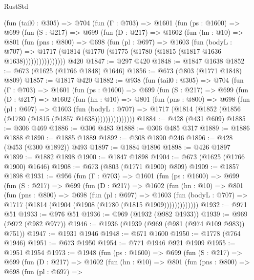 \begin{lexlean}{RustStd}
\begin{coremodule}
      (fun (tail0 : @305) =>
      @704
        (fun (Γ : @703) =>
        @1601
          (fun (ps : @1600) =>
          @699
            (fun (S : @217) =>
            @699
              (fun (D : @217) =>
              @1602
                (fun (hn : @10) =>
                @801
                  (fun (pns : @800) =>
                  @698
                    (fun (pl : @697) =>
                    @1603
                      (fun (bodyL : @707) =>
                      @1717 (@1814 (@1770 (@1775 (@1780 (@1815 (@1817 @1636 @1638))))))))))))))))
    @420
@1847 := @297 @420
@1848 := @1847 @1638
@1852 := @673 (@1625 (@1766 @1848) @1646)
@1856 := @673 (@803 (@1771 @1848) @809)
@1857 := @1817 @420
@1882 := @938
    (fun (tail0 : @305) =>
    @704
      (fun (Γ : @703) =>
      @1601
        (fun (ps : @1600) =>
        @699
          (fun (S : @217) =>
          @699
            (fun (D : @217) =>
            @1602
              (fun (hn : @10) =>
              @801
                (fun (pns : @800) =>
                @698
                  (fun (pl : @697) =>
                  @1603
                    (fun (bodyL : @707) =>
                    @1717 (@1814 (@1852 (@1856 (@1780 (@1815 (@1857 @1638)))))))))))))))
@1884 := @428 (@431 @609)
@1885 := @306 @469
@1886 := @306 @483
@1888 := @306 @485 @317
@1889 := @1886 @1888
@1890 := @1885 @1889
@1892 := @308 @1890 @246
@1896 := @428 (@453 (@300 @1892)) @493
@1897 := @1884 @1896
@1898 := @426 @1897
@1899 := @1882 @1898
@1900 := @1847 @1898
@1904 := @673 (@1625 (@1766 @1900) @1646)
@1908 := @673 (@803 (@1771 @1900) @809)
@1909 := @1857 @1898
@1931 := @956
    (fun (Γ : @703) =>
    @1601
      (fun (ps : @1600) =>
      @699
        (fun (S : @217) =>
        @699
          (fun (D : @217) =>
          @1602
            (fun (hn : @10) =>
            @801
              (fun (pns : @800) =>
              @698
                (fun (pl : @697) =>
                @1603
                  (fun (bodyL : @707) => @1717 (@1814 (@1904 (@1908 (@1780 (@1815 @1909)))))))))))))
@1932 := @971 @51
@1933 := @976 @51
@1936 := @969 (@1932 (@982 @1933))
@1939 := @969 (@972 (@982 @977))
@1946 := @1936 (@1939 (@969 (@981 (@974 @109 @983)) @751))
@1947 := @1931 @1946
@1948 := @671 @1600
@1950 := @1778 (@764 @1946)
@1951 := @673 @1950
@1954 := @771 @1946 @921 @1909
@1955 := @1951 @1954
@1973 := @1948
    (fun (ps : @1600) =>
    @699
      (fun (S : @217) =>
      @699
        (fun (D : @217) =>
        @1602
          (fun (hn : @10) =>
          @801
            (fun (pns : @800) =>
            @698
              (fun (pl : @697) =>

\end{coremodule}
\end{lexlean}
